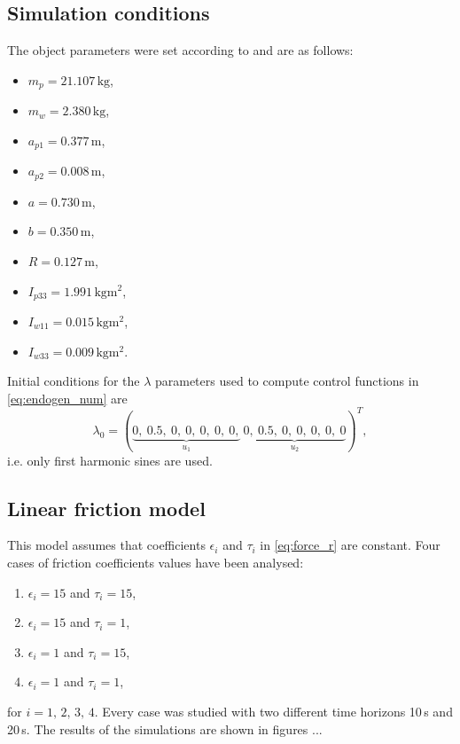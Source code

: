 \subsection{Simulation conditions}
The object parameters were set according to \cite{coupled} and are as follows:
\begin{multicols}{2}
\begin{itemize}
\item $m_p = 21.107\,\mathrm{kg}$,
\item $m_w = 2.380\,\mathrm{kg}$,
\item $a_{p1} = 0.377\,\mathrm{m}$,
\item $a_{p2} = 0.008\,\mathrm{m}$,
\item $a = 0.730\,\mathrm{m}$,
\item $b = 0.350\,\mathrm{m}$,
\item $R = 0.127\,\mathrm{m}$,
\item $I_{p33} = 1.991\,\mathrm{kgm^2}$,
\item $I_{w11} = 0.015\,\mathrm{kgm^2}$,
\item $I_{w33} = 0.009\,\mathrm{kgm^2}$.
\end{itemize}
\end{multicols}
\setcounter{MaxMatrixCols}{14}
Initial conditions for the $\lambda$ parameters used to compute control functions
in \eqref{eq:endogen_num} are
\begin{equation}
\lambda_0=
(\underbrace{0, \ 0.5, \ 0, \ 0, \ 0, \ 0, \ 0,}_{u_1}\ \underbrace{0, \ 0.5, \ 0, \ 0, \ 0, \ 0, \ 0}_{u_2})^T,
\end{equation}
i.e. only first harmonic sines are used.
 	

\subsection{Linear friction model}
This model assumes that coefficients $\epsilon_i$ and $\tau_i$ in \eqref{eq:force_r} are constant. Four cases of friction coefficients values have been analysed:
\begin{enumerate}
\item $\epsilon_i=15$ and $\tau_i=15$,
\item $\epsilon_i=15$ and $\tau_i=1$,
\item $\epsilon_i=1$ and $\tau_i=15$,
\item $\epsilon_i=1$ and $\tau_i=1$,
\end{enumerate}
for $i=1,\,2,\,3,\,4$.
Every case was studied with two different time horizons 10\,s and 20\,s. The results of the simulations are shown in figures ...

